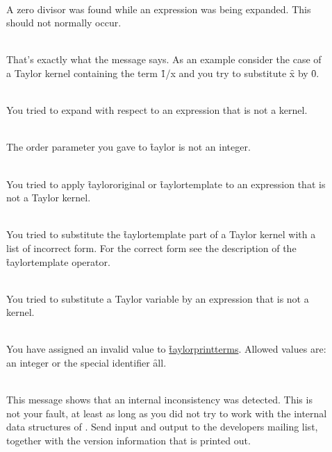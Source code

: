 \begin{description}
\item[]\mbox{}\\
    A zero divisor was found while an expression was being expanded.
    This should not normally occur.

\item[]\mbox{}\\
    That's exactly what the message says.  As an example consider the
    case of a Taylor kernel containing the term \f{1/x} and you try
    to substitute \f{x} by \f{0}.

\item[]\mbox{}\\
    You tried to expand with respect to an expression that is not a
    kernel.

\item[]\mbox{}\\
    The order parameter you gave to \f{taylor} is not an integer.

\item[]\mbox{}\\
%
    You tried to apply \f{taylororiginal} or \f{taylortemplate}
    to an expression that is not a Taylor kernel.

\item[]\mbox{}\\
    You tried to substitute the \f{taylortemplate} part of a Taylor
    kernel with a list of incorrect form. For the correct form see the
    description of the \f{taylortemplate} operator.

\item[]\mbox{}\\
    You tried to substitute a Taylor variable by an expression that is
    not a kernel.

\item[]\mbox{}\\
    You have assigned an invalid value to \hyperlink{reserved:TAYLORPRINTTERMS}{\f{taylorprintterms}}.
    Allowed values are: an integer or the special identifier
    \f{all}.

\item[]\mbox{}\\
    This message shows that an internal inconsistency was detected.
    This is not your fault, at least as long as you did not try to
    work with the internal data structures of \REDUCE. Send input
    and output to the \REDUCE developers mailing list, together with
    the version information that is printed out.

\end{description}

